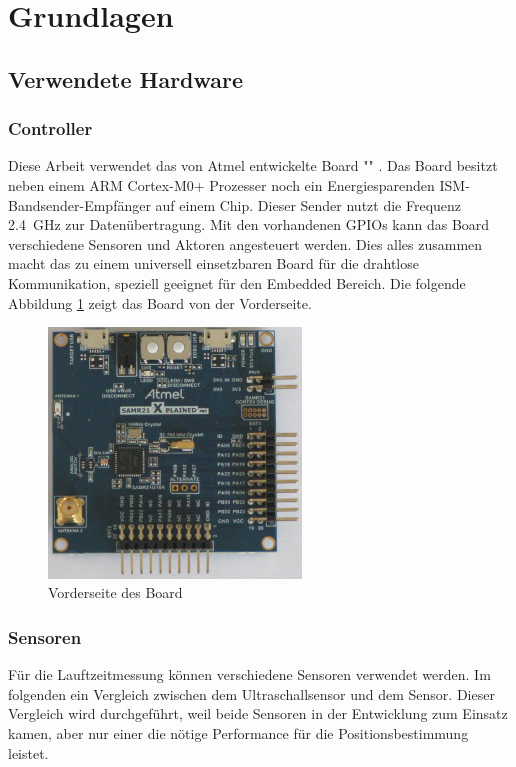 \newpage
\section{Grundlagen}

\subsection{Verwendete Hardware}
\subsubsection{Controller}
Diese Arbeit verwendet das von Atmel entwickelte Board "\board" \cite{src_SAMR}. Das Board besitzt neben einem ARM Cortex-M0+ Prozesser noch ein Energiesparenden ISM-Bandsender-Empfänger auf einem Chip. Dieser Sender nutzt die Frequenz \SI{2,4}{\giga \hertz} zur Datenübertragung. Mit den vorhandenen GPIOs kann das Board verschiedene Sensoren und Aktoren angesteuert werden. Dies alles zusammen macht das \board \platz zu einem universell einsetzbaren Board für die drahtlose Kommunikation, speziell geeignet für den Embedded Bereich. Die folgende Abbildung \ref{img:samr21} zeigt das \board Board von der Vorderseite.
\begin{figure}[!ht]
	\centering
	\includegraphics[width=0.6\textwidth]{images/samr21.png}
	\caption{Vorderseite des \board Board}
	\label{img:samr21}
\end{figure}

\subsubsection{Sensoren}
Für die Lauftzeitmessung können verschiedene Sensoren verwendet werden. Im folgenden ein Vergleich zwischen dem Ultraschallsensor \ultraschall \platz und dem \microphone \platz Sensor. Dieser Vergleich wird durchgeführt, weil beide Sensoren in der Entwicklung zum Einsatz kamen, aber nur einer die nötige Performance für die Positionsbestimmung leistet.

